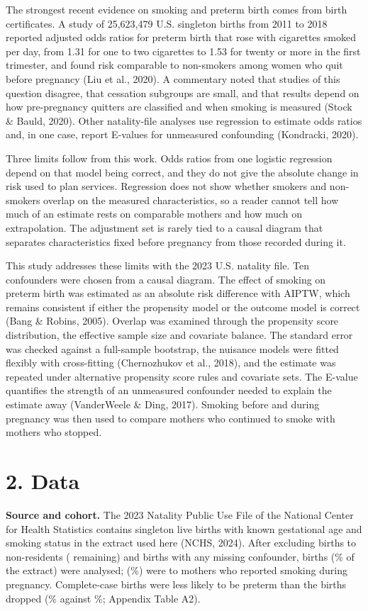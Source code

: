 \documentclass[11pt,letterpaper]{article}
\begin{document}
The strongest recent evidence on smoking and preterm birth comes from birth certificates. A study of 25,623,479 U.S. singleton births from 2011 to 2018 reported adjusted odds ratios for preterm birth that rose with cigarettes smoked per day, from 1.31 for one to two cigarettes to 1.53 for twenty or more in the first trimester, and found risk comparable to non-smokers among women who quit before pregnancy (Liu et al., 2020). A commentary noted that studies of this question disagree, that cessation subgroups are small, and that results depend on how pre-pregnancy quitters are classified and when smoking is measured (Stock \& Bauld, 2020). Other natality-file analyses use regression to estimate odds ratios and, in one case, report E-values for unmeasured confounding (Kondracki, 2020).

Three limits follow from this work. Odds ratios from one logistic regression depend on that model being correct, and they do not give the absolute change in risk used to plan services. Regression does not show whether smokers and non-smokers overlap on the measured characteristics, so a reader cannot tell how much of an estimate rests on comparable mothers and how much on extrapolation. The adjustment set is rarely tied to a causal diagram that separates characteristics fixed before pregnancy from those recorded during it.

This study addresses these limits with the 2023 U.S. natality file. Ten confounders were chosen from a causal diagram. The effect of smoking on preterm birth was estimated as an absolute risk difference with AIPTW, which remains consistent if either the propensity model or the outcome model is correct (Bang \& Robins, 2005). Overlap was examined through the propensity score distribution, the effective sample size and covariate balance. The standard error was checked against a full-sample bootstrap, the nuisance models were fitted flexibly with cross-fitting (Chernozhukov et al., 2018), and the estimate was repeated under alternative propensity score rules and covariate sets. The E-value quantifies the strength of an unmeasured confounder needed to explain the estimate away (VanderWeele \& Ding, 2017). Smoking before and during pregnancy was then used to compare mothers who continued to smoke with mothers who stopped.

\section*{2. Data}

\textbf{Source and cohort.} The 2023 Natality Public Use File of the National Center for Health Statistics contains \NExtract{} singleton live births with known gestational age and smoking status in the extract used here (NCHS, 2024). After excluding births to non-residents (\NResident{} remaining) and births with any missing confounder, \NTotal{} births (\PctKept{}\% of the extract) were analysed; \NSmokers{} (\PrevSmoke{}\%) were to mothers who reported smoking during pregnancy. Complete-case births were less likely to be preterm than the \NDropped{} births dropped (\KeptPreterm{}\% against \DroppedPreterm{}\%; Appendix Table A2).
\end{document}
